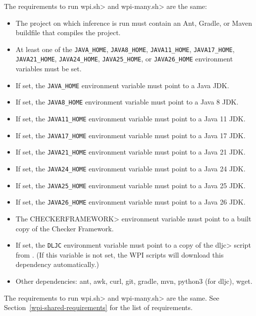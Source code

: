 
The requirements to run \<wpi.sh> and \<wpi-many.sh> are the same:

\begin{itemize}
\item The project on which inference is run must contain an Ant, Gradle,
  or Maven buildfile that compiles the project.
\item At least one of the \verb|JAVA_HOME|, \verb|JAVA8_HOME|,
  \verb|JAVA11_HOME|, \verb|JAVA17_HOME|, \verb|JAVA21_HOME|,
  \verb|JAVA24_HOME|, \verb|JAVA25_HOME|, or \verb|JAVA26_HOME|
  environment variables must be set.
\item If set, the \verb|JAVA_HOME| environment variable must point to a
  Java JDK.
\item If set, the \verb|JAVA8_HOME| environment variable must point to a Java 8 JDK.
\item If set, the \verb|JAVA11_HOME| environment variable must point to a Java 11 JDK.
\item If set, the \verb|JAVA17_HOME| environment variable must point to a Java 17 JDK.
\item If set, the \verb|JAVA21_HOME| environment variable must point to a Java 21 JDK.
\item If set, the \verb|JAVA24_HOME| environment variable must point to a Java 24 JDK.
\item If set, the \verb|JAVA25_HOME| environment variable must point to a Java 25 JDK.
\item If set, the \verb|JAVA26_HOME| environment variable must point to a Java 26 JDK.
\item The \<CHECKERFRAMEWORK> environment variable must point to a built copy of the Checker Framework.
\item If set, the \verb|DLJC| environment variable must point to a copy of the \<dljc> script
from . (If this variable is not
set, the WPI scripts will download this dependency automatically.)
\item Other dependencies:
  ant,
  awk,
  curl,
  git,
  gradle,
  mvn,
  python3 (for dljc),
  wget.
\end{itemize}




The requirements to run \<wpi.sh> and \<wpi-many.sh> are the same. See Section~\ref{wpi-shared-requirements}
for the list of requirements.


